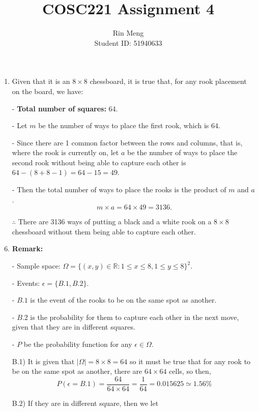 \documentclass[12pt]{article}
\begin{document}
\title{COSC221 Assignment 4}
\author{Rin Meng \\ Student ID: 51940633}
\maketitle


\begin{enumerate}[label=Part \Alph*)]
    \item Given that it is an $8 \times 8$ chessboard, it is true that, for any rook placement on the board, we have:
    \item[-] \textbf{Total number of squares:} 64.
    \item[-] Let $m$ be the number of ways to place the first rook, which is $64$.
    \item[-] Since there are 1 common factor between the rows and columns, that is, where the rook is currently on, let $a$ be the number of ways to place the second rook without being able to capture each other is $64 - (8 + 8 - 1) = 64 - 15 = 49$. 
    \item[-] Then the total number of ways to place the rooks is the product of $m$ and $a$. 
    $$m \times a = 64 \times 49 = 3136.$$
    
    $\therefore$ There are 3136 ways of putting a black and a white rook on a $8 \times 8$ chessboard without them being able to capture each other.
    
    \item \textbf{Remark:}
    \item[-] Sample space: $\Omega = \{(x,y) \in \mathbb{R} : 1 \leq x \leq 8, 1 \leq y \leq 8\}^2$.
    \item[-] Events: $\epsilon = \{B.1, B.2\}$.
    \item[-] $B.1$ is the event of the rooks to be on the same spot as another.
    \item[-] $B.2$ is the probability for them to capture each other in the next move, given that they are in different squares.
    \item[-] $P$ be the probability function for any $\epsilon \in \Omega$.
    
    \item[B.1)] It is given that $|\Omega| = 8 \times 8 = 64$ so it must be true that for any rook to be on the same spot as another, there are $64 \times 64$ cells, so then,
    $$P(\epsilon = B.1) = \frac{64}{64 \times 64} = \frac{1}{64} = 0.015625 \simeq 1.56\%$$
    
    \item[B.2)] If they are in different square, then we let 
    

\end{enumerate}
\end{document}
